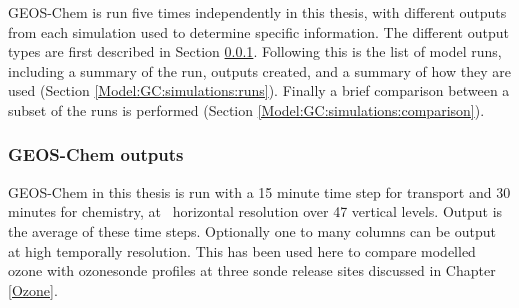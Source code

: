    GEOS-Chem is run five times independently in this thesis, with different outputs from each simulation used to determine specific information. 
    The different output types are first described in Section \ref{Model:GC:simulations:outputs}.
    Following this is the list of model runs, including a summary of the run, outputs created, and a summary of how they are used (Section \ref{Model:GC:simulations:runs}).
    Finally a brief comparison between a subset of the runs is performed (Section \ref{Model:GC:simulations:comparison}).
    
    \subsubsection{GEOS-Chem outputs}
      \label{Model:GC:simulations:outputs}
      
      GEOS-Chem in this thesis is run with a 15 minute time step for transport and 30 minutes for chemistry, at \lowhr ~horizontal resolution over 47 vertical levels.
      Output is the average of these time steps.
      Optionally one to many columns can be output at high temporally resolution.
      This has been used here to compare modelled ozone with ozonesonde profiles at three sonde release sites discussed in Chapter \ref{Ozone}.
      

